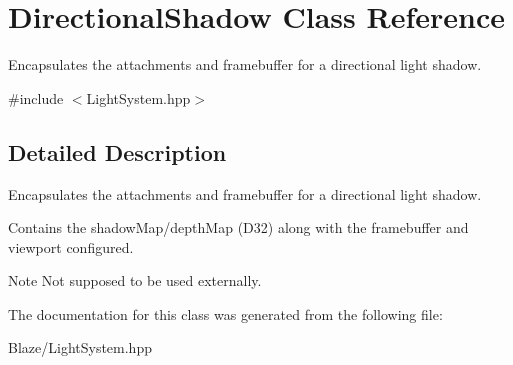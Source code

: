 \hypertarget{classDirectionalShadow}{}\section{Directional\+Shadow Class Reference}
\label{classDirectionalShadow}


Encapsulates the attachments and framebuffer for a directional light shadow.  




{\ttfamily \#include $<$Light\+System.\+hpp$>$}



\subsection{Detailed Description}
Encapsulates the attachments and framebuffer for a directional light shadow. 

Contains the shadow\+Map/depth\+Map (D32) along with the framebuffer and viewport configured.

\begin{DoxyNote}{Note}
Not supposed to be used externally. 
\end{DoxyNote}


The documentation for this class was generated from the following file\+:\begin{DoxyCompactItemize}
\item 
Blaze/Light\+System.\+hpp\end{DoxyCompactItemize}
